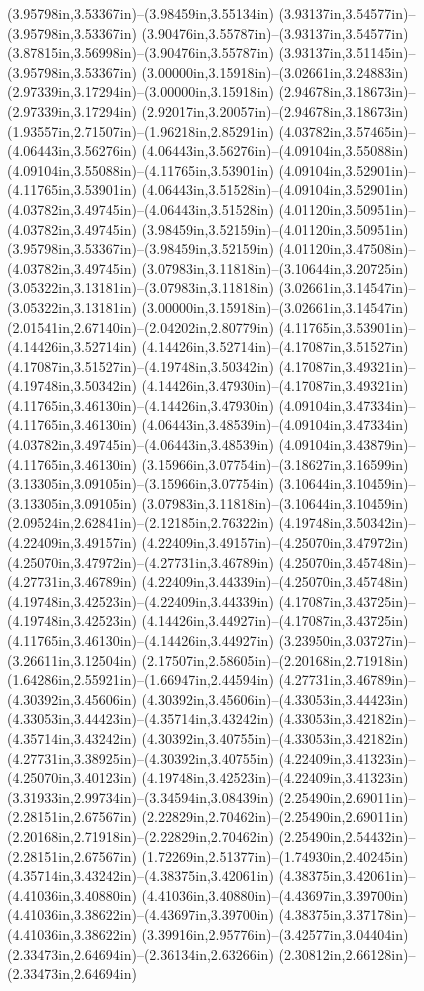 (3.95798in,3.53367in)--(3.98459in,3.55134in) (3.93137in,3.54577in)--(3.95798in,3.53367in) (3.90476in,3.55787in)--(3.93137in,3.54577in) (3.87815in,3.56998in)--(3.90476in,3.55787in) (3.93137in,3.51145in)--(3.95798in,3.53367in) (3.00000in,3.15918in)--(3.02661in,3.24883in) (2.97339in,3.17294in)--(3.00000in,3.15918in) (2.94678in,3.18673in)--(2.97339in,3.17294in) (2.92017in,3.20057in)--(2.94678in,3.18673in) (1.93557in,2.71507in)--(1.96218in,2.85291in) (4.03782in,3.57465in)--(4.06443in,3.56276in) (4.06443in,3.56276in)--(4.09104in,3.55088in) (4.09104in,3.55088in)--(4.11765in,3.53901in) (4.09104in,3.52901in)--(4.11765in,3.53901in) (4.06443in,3.51528in)--(4.09104in,3.52901in) (4.03782in,3.49745in)--(4.06443in,3.51528in) (4.01120in,3.50951in)--(4.03782in,3.49745in) (3.98459in,3.52159in)--(4.01120in,3.50951in) (3.95798in,3.53367in)--(3.98459in,3.52159in) (4.01120in,3.47508in)--(4.03782in,3.49745in) (3.07983in,3.11818in)--(3.10644in,3.20725in) (3.05322in,3.13181in)--(3.07983in,3.11818in) (3.02661in,3.14547in)--(3.05322in,3.13181in) (3.00000in,3.15918in)--(3.02661in,3.14547in) (2.01541in,2.67140in)--(2.04202in,2.80779in) (4.11765in,3.53901in)--(4.14426in,3.52714in) (4.14426in,3.52714in)--(4.17087in,3.51527in) (4.17087in,3.51527in)--(4.19748in,3.50342in) (4.17087in,3.49321in)--(4.19748in,3.50342in) (4.14426in,3.47930in)--(4.17087in,3.49321in) (4.11765in,3.46130in)--(4.14426in,3.47930in) (4.09104in,3.47334in)--(4.11765in,3.46130in) (4.06443in,3.48539in)--(4.09104in,3.47334in) (4.03782in,3.49745in)--(4.06443in,3.48539in) (4.09104in,3.43879in)--(4.11765in,3.46130in) (3.15966in,3.07754in)--(3.18627in,3.16599in) (3.13305in,3.09105in)--(3.15966in,3.07754in) (3.10644in,3.10459in)--(3.13305in,3.09105in) (3.07983in,3.11818in)--(3.10644in,3.10459in) (2.09524in,2.62841in)--(2.12185in,2.76322in) (4.19748in,3.50342in)--(4.22409in,3.49157in) (4.22409in,3.49157in)--(4.25070in,3.47972in) (4.25070in,3.47972in)--(4.27731in,3.46789in) (4.25070in,3.45748in)--(4.27731in,3.46789in) (4.22409in,3.44339in)--(4.25070in,3.45748in) (4.19748in,3.42523in)--(4.22409in,3.44339in) (4.17087in,3.43725in)--(4.19748in,3.42523in) (4.14426in,3.44927in)--(4.17087in,3.43725in) (4.11765in,3.46130in)--(4.14426in,3.44927in) (3.23950in,3.03727in)--(3.26611in,3.12504in) (2.17507in,2.58605in)--(2.20168in,2.71918in) (1.64286in,2.55921in)--(1.66947in,2.44594in) (4.27731in,3.46789in)--(4.30392in,3.45606in) (4.30392in,3.45606in)--(4.33053in,3.44423in) (4.33053in,3.44423in)--(4.35714in,3.43242in) (4.33053in,3.42182in)--(4.35714in,3.43242in) (4.30392in,3.40755in)--(4.33053in,3.42182in) (4.27731in,3.38925in)--(4.30392in,3.40755in) (4.22409in,3.41323in)--(4.25070in,3.40123in) (4.19748in,3.42523in)--(4.22409in,3.41323in) (3.31933in,2.99734in)--(3.34594in,3.08439in) (2.25490in,2.69011in)--(2.28151in,2.67567in) (2.22829in,2.70462in)--(2.25490in,2.69011in) (2.20168in,2.71918in)--(2.22829in,2.70462in) (2.25490in,2.54432in)--(2.28151in,2.67567in) (1.72269in,2.51377in)--(1.74930in,2.40245in) (4.35714in,3.43242in)--(4.38375in,3.42061in) (4.38375in,3.42061in)--(4.41036in,3.40880in) (4.41036in,3.40880in)--(4.43697in,3.39700in) (4.41036in,3.38622in)--(4.43697in,3.39700in) (4.38375in,3.37178in)--(4.41036in,3.38622in) (3.39916in,2.95776in)--(3.42577in,3.04404in) (2.33473in,2.64694in)--(2.36134in,2.63266in) (2.30812in,2.66128in)--(2.33473in,2.64694in) 